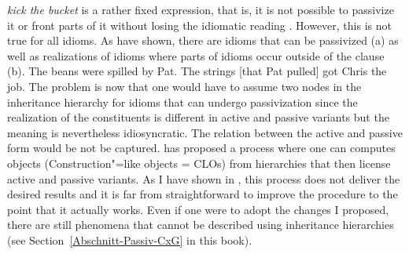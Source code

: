 \begin{exe}
\begin{xlist}[iv.]
\begin{exe}
\begin{xlist}[iv.]
\emph{kick the bucket} is a rather fixed expression, that is, it is not possible to passivize it or front parts of it without losing
the idiomatic reading \citep*[]{NSW94a}. However, this is not true for all idioms. As \citet*[]{NSW94a} have shown, there are idioms that can be passivized
(a) as well as realizations of idioms where parts of idioms occur outside of the clause (b).
\eal
\ex The beans were spilled by Pat.
\ex The strings [that Pat pulled] got Chris the job.
\zl
%
%
The problem is now that one would have to assume two nodes in the inheritance hierarchy for idioms
that can undergo passivization since the realization of the constituents is different in active and
passive variants but the meaning is nevertheless idiosyncratic. The relation between the active and passive form would be not be captured.
\citet{Kay2002a} has proposed a process where one can computes objects (Construction"=like objects = CLOs) from hierarchies that then license active and passive variants. As I
have shown in \citet[Section~3]{Mueller2006d}, this process does not deliver the desired results and it is far from straightforward to improve the procedure to the point
that it actually works. Even if one were to adopt the changes I proposed, there are still phenomena that cannot be described using inheritance hierarchies
(see Section~\ref{Abschnitt-Passiv-CxG} in this book).


\end{xlist}
\end{exe}
\end{xlist}
\end{exe}
